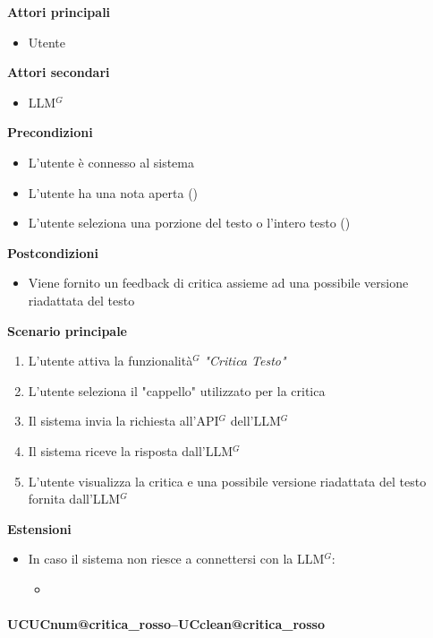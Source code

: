 \documentclass[a4paper,10pt]{article}
\makeatletter
\def\UCText#1{UC\csname UCnum@#1\endcsname\space--\space\csname UCclean@#1\endcsname}%
\makeatother
\begin{document}
    \textbf{Attori principali}
    \begin{itemize}
        \item Utente
    \end{itemize}
    \textbf{Attori secondari}
    \begin{itemize}
        \item LLM$^G$
    \end{itemize}
    \textbf{Precondizioni}
    \begin{itemize}
        \item L'utente è connesso al sistema
        \item L'utente ha una nota aperta ()
        \item L'utente seleziona una porzione del testo o l'intero testo ()
    \end{itemize}
    \textbf{Postcondizioni}
    \begin{itemize}
        \item Viene fornito un feedback di critica assieme ad una possibile versione riadattata del testo
    \end{itemize}
    \textbf{Scenario principale}
    \begin{enumerate}
        \item L'utente attiva la funzionalità$^G$ \textit{"Critica Testo"}
        \item L'utente seleziona il "cappello" utilizzato per la critica
        \item Il sistema invia la richiesta all'API$^G$ dell'LLM$^G$
        \item Il sistema riceve la risposta dall'LLM$^G$
        \item L'utente visualizza la critica e una possibile versione riadattata del testo fornita dall'LLM$^G$
    \end{enumerate}
    \textbf{Estensioni}
    \begin{itemize}
        \item In caso il sistema non riesce a connettersi con la LLM$^G$:
        \begin{itemize}
            \item {}
        \end{itemize}
    \end{itemize}

    \paragraph{\UCText{critica_rosso}}
\end{document}

